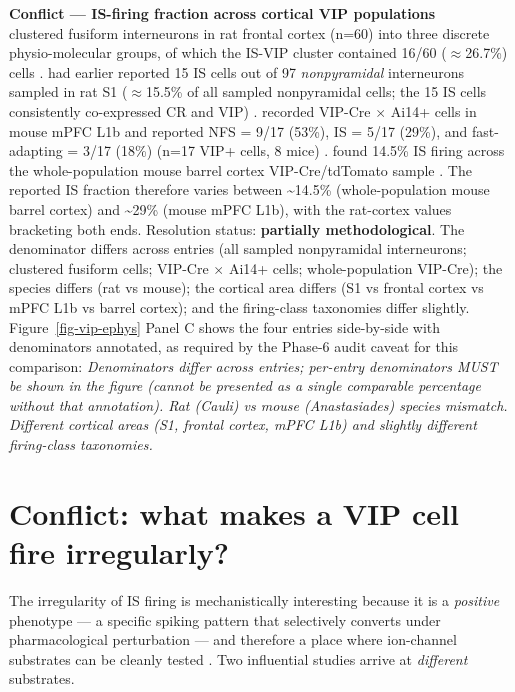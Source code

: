 \documentclass[11pt]{article}
\begin{document}
\begin{framed}
\textbf{Conflict --- IS-firing fraction across cortical VIP populations}\\
\citet{Cauli2000} clustered fusiform interneurons in rat frontal cortex (n=60) into three discrete physio-molecular groups, of which the IS-VIP cluster contained 16/60 ($\approx$26.7\%) cells \citep{Cauli2000}. \citet{Cauli1997} had earlier reported 15 IS cells out of 97 \textit{nonpyramidal} interneurons sampled in rat S1 ($\approx$15.5\% of all sampled nonpyramidal cells; the 15 IS cells consistently co-expressed CR and VIP) \citep{Cauli1997}. \citet{Anastasiades2021a} recorded VIP-Cre $\times$ Ai14+ cells in mouse mPFC L1b and reported NFS = 9/17 (53\%), IS = 5/17 (29\%), and fast-adapting = 3/17 (18\%) (n=17 VIP+ cells, 8 mice) \citep{Anastasiades2021a}. \citet{Pronneke2015} found 14.5\% IS firing across the whole-population mouse barrel cortex VIP-Cre/tdTomato sample \citep{Pronneke2015}. The reported IS fraction therefore varies between {\textasciitilde}14.5\% (whole-population mouse barrel cortex) and {\textasciitilde}29\% (mouse mPFC L1b), with the rat-cortex values bracketing both ends. Resolution status: \textbf{partially methodological}. The denominator differs across entries (all sampled nonpyramidal interneurons; clustered fusiform cells; VIP-Cre $\times$ Ai14+ cells; whole-population VIP-Cre); the species differs (rat vs mouse); the cortical area differs (S1 vs frontal cortex vs mPFC L1b vs barrel cortex); and the firing-class taxonomies differ slightly. Figure~\ref{fig-vip-ephys} Panel C shows the four entries side-by-side with denominators annotated, as required by the Phase-6 audit caveat for this comparison: \textit{Denominators differ across entries; per-entry denominators MUST be shown in the figure (cannot be presented as a single comparable percentage without that annotation). Rat (Cauli) vs mouse (Anastasiades) species mismatch. Different cortical areas (S1, frontal cortex, mPFC L1b) and slightly different firing-class taxonomies.}
\end{framed}

\section{Conflict: what makes a VIP cell fire irregularly?}\label{sec-05-conflict-mechanism}

The irregularity of IS firing is mechanistically interesting because it is a \textit{positive} phenotype --- a specific spiking pattern that selectively converts under pharmacological perturbation --- and therefore a place where ion-channel substrates can be cleanly tested \citep{Porter1998, Goff2019, Guetmccreight2020b, Tremblay2016}. Two influential studies arrive at \textit{different} substrates.
\end{document}
